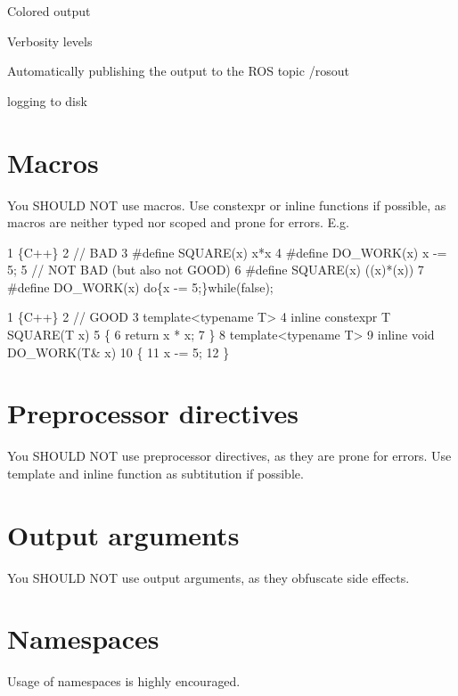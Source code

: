 \begin{DoxyItemize}
\item Colored output
\item Verbosity levels
\item Automatically publishing the output to the R\+OS topic {\ttfamily /rosout}
\item logging to disk
\end{DoxyItemize}

\section*{Macros}

You S\+H\+O\+U\+LD N\+OT use macros. Use {\ttfamily constexpr} or {\ttfamily inline} functions if possible, as macros are neither typed nor scoped and prone for errors. E.\+g. 
\begin{DoxyCode}
1 \{C++\}
2 // BAD
3 #define SQUARE(x) x*x
4 #define DO\_WORK(x) x -= 5;
5 // NOT BAD (but also not GOOD)
6 #define SQUARE(x) ((x)*(x))
7 #define DO\_WORK(x) do\{x -= 5;\}while(false);
\end{DoxyCode}
 
\begin{DoxyCode}
1 \{C++\}
2 // GOOD
3 template<typename T>
4 inline constexpr T SQUARE(T x)
5 \{
6     return x * x;
7 \}
8 template<typename T>
9 inline void DO\_WORK(T& x)
10 \{
11     x -= 5;
12 \}
\end{DoxyCode}


\section*{Preprocessor directives}

You S\+H\+O\+U\+LD N\+OT use preprocessor directives, as they are prone for errors. Use {\ttfamily template} and {\ttfamily inline} function as subtitution if possible.

\section*{Output arguments}

You S\+H\+O\+U\+LD N\+OT use output arguments, as they obfuscate side effects.

\section*{Namespaces}

Usage of namespaces is highly encouraged.

